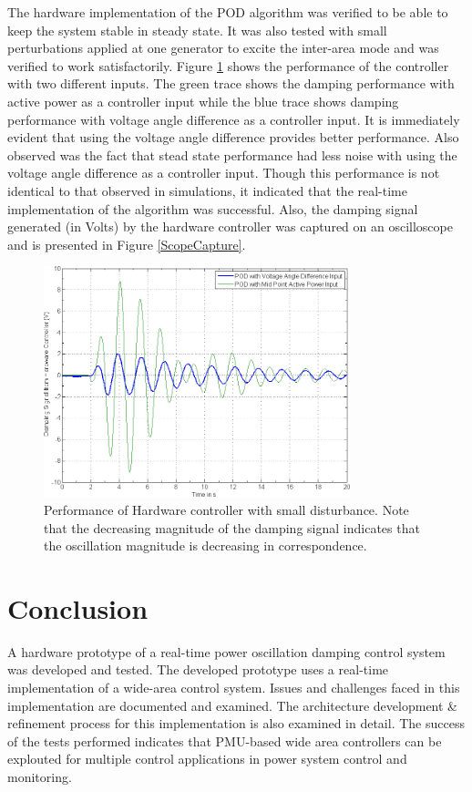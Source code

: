 \documentclass[conference]{IEEEtran}
\begin{document}
The hardware implementation of the POD algorithm was verified to be able to keep the system stable in steady state. It was also tested with small perturbations applied at one generator to excite the inter-area mode and was verified to work satisfactorily. Figure \ref{Results} shows the performance of the controller with two different inputs. The green trace shows the damping performance with active power as a controller input while the blue trace shows damping performance with voltage angle difference as a controller input. It is immediately evident that using the voltage angle difference provides better performance. Also observed was the fact that stead state performance had less noise with using the voltage angle difference as a controller input. Though this performance is not identical to that observed in simulations, it indicated that the real-time implementation of the algorithm was successful. Also, the damping signal generated (in Volts) by the hardware controller was captured on an oscilloscope and is presented in Figure \ref{ScopeCapture}.

\begin{figure}[!t]
\centering
\includegraphics[width=3.5in]{Results.png} 
\caption{Performance of Hardware controller with small disturbance. Note that the decreasing magnitude of the damping signal indicates that the oscillation magnitude is decreasing in correspondence.}
\label{Results}
\end{figure}

\section{Conclusion} \label{conclusion}
A hardware prototype of a real-time power oscillation damping control system was developed and tested. The developed prototype uses a real-time implementation of a wide-area control system. Issues and challenges faced in this implementation are documented and examined. The architecture development \& refinement process for this implementation is also examined in detail. The success of the tests performed indicates that PMU-based wide area controllers can be explouted for multiple control applications in power system control and monitoring.
\end{document}
